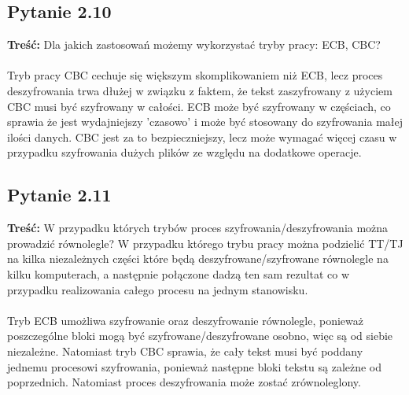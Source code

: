 \documentclass{article}
\begin{document}
\subsection{Pytanie 2.10}
    \textbf{Treść:} Dla jakich zastosowań możemy wykorzystać tryby pracy: ECB, CBC?\\\\
    Tryb pracy CBC cechuje się większym skomplikowaniem niż ECB, lecz proces deszyfrowania trwa dłużej w związku z faktem, że
    tekst zaszyfrowany z użyciem CBC musi być szyfrowany w całości. ECB może być szyfrowany w częściach, co sprawia że jest wydajniejszy 'czasowo' i może być stosowany do 
    szyfrowania małej ilości danych. CBC jest za to bezpieczniejszy, lecz może wymagać więcej czasu w przypadku szyfrowania dużych plików ze względu na dodatkowe operacje.
\subsection{Pytanie 2.11}
    \textbf{Treść:} W przypadku których trybów proces szyfrowania/deszyfrowania można prowadzić równolegle?
    W przypadku którego trybu pracy można podzielić TT/TJ na kilka niezależnych części które będą deszyfrowane/szyfrowane
    równolegle na kilku komputerach, a następnie połączone dadzą ten sam rezultat co w przypadku realizowania całego procesu
    na jednym stanowisku.\\\\
    Tryb ECB umożliwa szyfrowanie oraz deszyfrowanie równolegle, ponieważ poszczególne bloki mogą być szyfrowane/deszyfrowane osobno, więc są od siebie niezależne.
    Natomiast tryb CBC sprawia, że cały tekst musi być poddany jednemu procesowi szyfrowania, ponieważ następne bloki tekstu są zależne od poprzednich. Natomiast proces deszyfrowania może zostać zrównoleglony.
\end{document}
